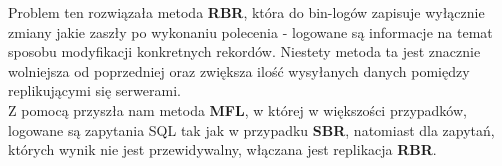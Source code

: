 Problem ten rozwiązała metoda \textbf{RBR}, która do bin-logów zapisuje wyłącznie zmiany jakie zaszły
po wykonaniu polecenia - logowane są informacje na temat sposobu modyfikacji konkretnych
rekordów. Niestety metoda ta jest znacznie wolniejsza od poprzedniej oraz zwiększa ilość
wysyłanych danych pomiędzy replikującymi się serwerami.\\

Z pomocą przyszła nam metoda \textbf{MFL}, w której w większości przypadków, logowane są zapytania
SQL tak jak w przypadku \textbf{SBR}, natomiast dla zapytań, których wynik nie jest przewidywalny,
włączana jest replikacja \textbf{RBR}.\\


